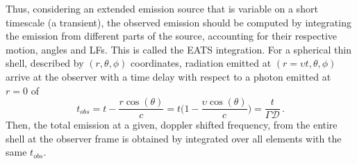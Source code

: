 %
%
%
%
Thus, considering an extended emission source that is variable on a short 
timescale (a transient), the observed emission should be computed by integrating 
the emission from different parts of the source, accounting for their respective 
motion, angles and \acp{LF}. This is called the \ac{EATS} integration. For a spherical 
thin shell, described by $(r, \theta, \phi)$ coordinates, radiation emitted 
at $(r=\upsilon t, \theta,\phi)$ arrive at the observer with a time delay with 
respect to a photon emitted at $r=0$ of
%
\begin{equation}
t_{obs} = t - \frac{r \cos(\theta)}{c} = t\Big(1-\frac{\upsilon\cos(\theta)}{c}\Big) = \frac{t}{\Gamma\mathcal{D}}\, .
\label{eq:afterglow:tobs}
\end{equation}
%
Then, the total emission at a given, doppler shifted frequency, from the entire 
shell at the observer frame is obtained by integrated over all elements with the 
same $t_{obs}$.

%

